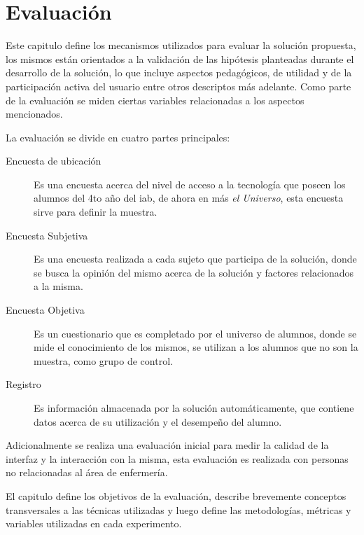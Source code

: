 
\chapter{Evaluación}


Este capitulo define los mecanismos utilizados para evaluar la solución
propuesta, los mismos están orientados a la validación de las hipótesis
planteadas durante el desarrollo de la solución, lo que incluye aspectos
pedagógicos, de utilidad y de la participación activa del usuario entre otros
descriptos más adelante. Como parte de la evaluación se miden ciertas variables
relacionadas a los aspectos mencionados.

La evaluación se divide en cuatro partes principales:

\begin{description}
    \item[Encuesta de ubicación] Es una encuesta acerca del nivel de acceso a la
        tecnología que poseen los alumnos del 4to año del \Gls{iab}, de ahora en
        más \textit{el Universo}, esta encuesta sirve para definir la muestra.

    \item[Encuesta Subjetiva] Es una encuesta realizada a cada sujeto que
        participa de la solución, donde se busca la opinión del mismo acerca de
        la solución y factores relacionados a la misma. 

    \item[Encuesta Objetiva] Es un cuestionario que es completado por el
        universo de alumnos, donde se mide el conocimiento de los mismos, se
        utilizan a los alumnos que no son la muestra, como grupo de control.

    \item[Registro] Es información almacenada por la solución automáticamente,
        que contiene datos acerca de su utilización y el desempeño del alumno.
\end{description}


Adicionalmente se realiza una evaluación inicial para medir la calidad de la
interfaz y la interacción con la misma, esta evaluación es realizada con
personas no relacionadas al área de enfermería.

El capitulo define los objetivos de la evaluación, describe brevemente conceptos
transversales a las técnicas utilizadas y luego define las metodologías,
métricas y variables utilizadas en cada experimento.








